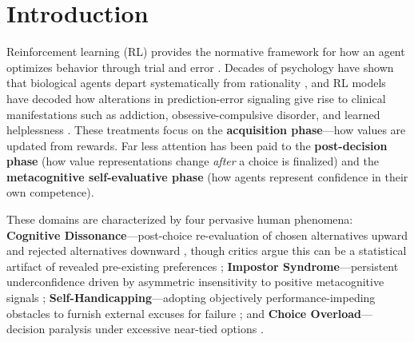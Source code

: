 \documentclass[conference]{IEEEtran}
\begin{document}
\section{Introduction}

Reinforcement learning (RL) provides the normative framework for how an agent optimizes behavior through trial and error \citep{sutton2018reinforcement}. Decades of psychology have shown that biological agents depart systematically from rationality \citep{kahneman2011thinking}, and RL models have decoded how alterations in prediction-error signaling give rise to clinical manifestations such as addiction, obsessive-compulsive disorder, and learned helplessness \citep{daw2005uncertainty,huys2009bayesian,dolan2013goals}. These treatments focus on the \textbf{acquisition phase}---how values are updated from rewards. Far less attention has been paid to the \textbf{post-decision phase} (how value representations change \textit{after} a choice is finalized) and the \textbf{metacognitive self-evaluative phase} (how agents represent confidence in their own competence).

These domains are characterized by four pervasive human phenomena: \textbf{Cognitive Dissonance}---post-choice re-evaluation of chosen alternatives upward and rejected alternatives downward \citep{brehm1956postdecision,festinger1957theory}, though critics argue this can be a statistical artifact of revealed pre-existing preferences \citep{chen2010choice}; \textbf{Impostor Syndrome}---persistent underconfidence driven by asymmetric insensitivity to positive metacognitive signals \citep{clance1978imposter,katyal2025distorted}; \textbf{Self-Handicapping}---adopting objectively performance-impeding obstacles to furnish external excuses for failure \citep{berglas1978drug}; and \textbf{Choice Overload}---decision paralysis under excessive near-tied options \citep{iyengar2000choice,schwartz2004paradox}.
\end{document}
